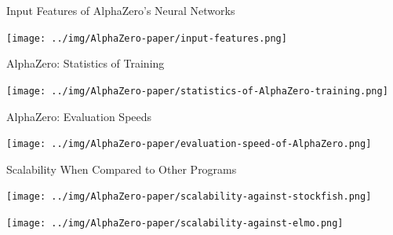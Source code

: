 \documentclass{beamer}
\begin{document}
  {

    \begin{frame}{Input Features of AlphaZero's Neural Networks}
      \begin{center}
        \texttt{[image: ../img/AlphaZero-paper/input-features.png]}
      \end{center}
    \end{frame}

    \begin{frame}{AlphaZero: Statistics of Training}
      \begin{center}
        \texttt{[image: ../img/AlphaZero-paper/statistics-of-AlphaZero-training.png]}
      \end{center}
    \end{frame}

    \begin{frame}{AlphaZero: Evaluation Speeds}
      \begin{center}
        \texttt{[image: ../img/AlphaZero-paper/evaluation-speed-of-AlphaZero.png]}
      \end{center}
    \end{frame}

    \begin{frame}{Scalability When Compared to Other Programs}
      \begin{center}
        \texttt{[image: ../img/AlphaZero-paper/scalability-against-stockfish.png]}

        \texttt{[image: ../img/AlphaZero-paper/scalability-against-elmo.png]}
      \end{center}
    \end{frame}
  }
\end{document}
